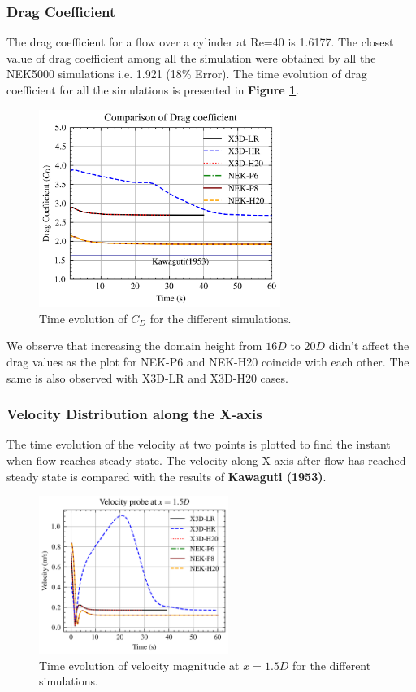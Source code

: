 \documentclass[11pt]{article}
\begin{document}
\subsubsection*{Drag Coefficient}
The drag coefficient for a flow over a cylinder at Re=40 is 1.6177.
The closest value of drag coefficient among all the simulation were obtained by all the NEK5000 simulations i.e. 1.921 (18\% Error).
The time evolution of drag coefficient for all the simulations is presented in \textbf{Figure \ref{fig:drag}}.

\begin{figure}[H]
    \centering
    \includegraphics[width=0.7\textwidth]{../drag.png}
    \caption{Time evolution of $C_D$ for the different simulations.}
    \label{fig:drag}
\end{figure}

\noindent We observe that increasing the domain height from $16D$ to $20D$ didn't affect the drag values
as the plot for NEK-P6 and NEK-H20 coincide with each other. The same is also observed with X3D-LR and X3D-H20 cases.

\newpage
\subsubsection*{Velocity Distribution along the X-axis}
The time evolution of the velocity at two points is plotted to find the instant when flow reaches steady-state.
The velocity along X-axis after flow has reached steady state is compared with the results of \textbf{Kawaguti (1953)}.

\begin{figure}[H]
    \centering
    \includegraphics[width=0.55\textwidth]{../ss3.png}
    \caption{Time evolution of velocity magnitude at $x=1.5 D$ for the different simulations.}
    \label{fig:ss3}
\end{figure}
\end{document}
